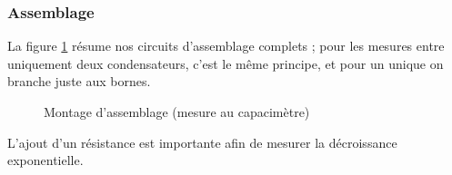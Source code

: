 \documentclass[11pt]{article}
\begin{document}
\subsubsection*{Assemblage}

La figure \ref{fig:cap-schem2} résume nos circuits d’assemblage complets ; pour les mesures entre uniquement deux condensateurs, c'est le même principe, et pour un unique on branche juste aux bornes.

\begin{figure}[H]
\centering
{}\hfill
{}\hfill
{}\hfill
\caption{Montage d'assemblage (mesure au capacimètre)}
\label{fig:cap-schem2}
\end{figure}

L'ajout d'un résistance est importante afin de mesurer la décroissance exponentielle.
\end{document}
